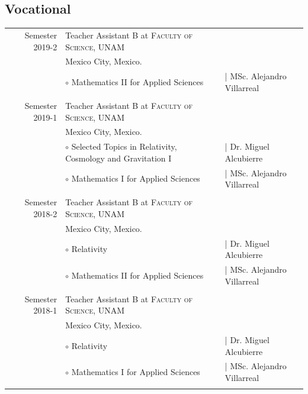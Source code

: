 \documentclass[a4paper,10pt]{article} %
\begin{document}
\subsection*{Vocational}
\begin{tabular}{r|p{7.8cm}p{4cm}}

Semester 2019-2 & Teacher Assistant B at \textsc{Faculty of Science, UNAM} &\\
& \small Mexico City, Mexico. & \\
& \footnotesize $\circ$ Mathematics II for Applied Sciences & | {\footnotesize MSc. Alejandro Villarreal}\\
\multicolumn{3}{c}{} \\


Semester 2019-1 & Teacher Assistant B at \textsc{Faculty of Science, UNAM} &\\
& \small Mexico City, Mexico. & \\
& \footnotesize $\circ$ Selected Topics in Relativity, Cosmology and Gravitation I & | {\footnotesize Dr. Miguel Alcubierre}\\
& \footnotesize $\circ$ Mathematics I for Applied Sciences & | {\footnotesize MSc. Alejandro Villarreal}\\
\multicolumn{3}{c}{} \\


Semester 2018-2 & Teacher Assistant B at \textsc{Faculty of Science, UNAM} &\\
& \small Mexico City, Mexico. & \\
& \footnotesize $\circ$ Relativity & | {\footnotesize Dr. Miguel Alcubierre}\\
& \footnotesize $\circ$ Mathematics II for Applied Sciences & | {\footnotesize MSc. Alejandro Villarreal}\\
\multicolumn{3}{c}{} \\


Semester 2018-1 & Teacher Assistant B at \textsc{Faculty of Science, UNAM} &\\
&\small Mexico City, Mexico. & \\
& \footnotesize $\circ$ Relativity & | {\footnotesize Dr. Miguel Alcubierre}\\
& \footnotesize $\circ$ Mathematics I for Applied Sciences & | {\footnotesize MSc. Alejandro Villarreal}\\
\multicolumn{3}{c}{} \\

\end{tabular}
\end{document}
